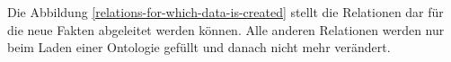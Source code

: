 \begin{figure}
\begin{center}
\end{center}
\end{figure}

Die Abbildung \ref{relations-for-which-data-is-created} stellt die Relationen dar für die neue Fakten abgeleitet werden können. Alle anderen Relationen werden nur beim Laden einer Ontologie gefüllt und danach nicht mehr verändert.

